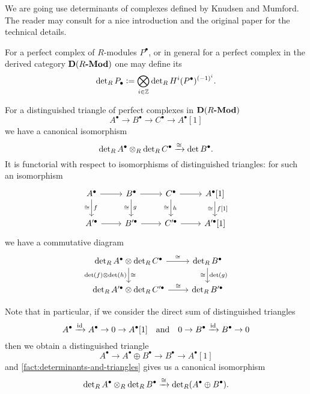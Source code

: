 We are going use determinants of complexes defined by Knudsen and Mumford.
The reader may consult \cite[Appendix A]{Gelfand-Kapranov-Zelevinsky} for a nice
introduction and the original paper \cite{Knudsen-Mumford-76} for the technical
details.

For a perfect complex of $R$-modules $P^\bullet$, or in general for a perfect
complex in the derived category $\text{\bf D} (R\text{\bf -Mod})$ one may define its
\[ \det\nolimits_R P_\bullet \mathrel{\mathop:}=
  \bigotimes_{i\in\mathbb{Z}} \det\nolimits_R H^i (P^\bullet)^{(-1)^i}. \]

\begin{fact}
  \label{fact:determinants-and-triangles}
  For a distinguished triangle of perfect complexes in
  $\text{\bf D} (R\text{\bf -Mod})$
  $$A^\bullet \to B^\bullet \to C^\bullet \to A^\bullet [1]$$
  we have a canonical isomorphism
  $$\det\nolimits_R A^\bullet \otimes_R \det\nolimits_R C^\bullet \xrightarrow{\cong} \det B^\bullet.$$
  It is functorial with respect to isomorphisms of distinguished triangles:
  for such an isomorphism
  \[ \begin{tikzcd}
      A^\bullet \arrow{r}\arrow{d}{f}[swap]{\isom} & B^\bullet \arrow{r}\arrow{d}{g}[swap]{\isom} & C^\bullet \arrow{r}\ar{d}{h}[swap]{\isom} & A^\bullet [1]\arrow{d}{f [1]}[swap]{\isom} \\
      A'^\bullet \arrow{r} & B'^\bullet \arrow{r} & C'^\bullet \arrow{r} & A'^\bullet [1]
    \end{tikzcd} \]
  we have a commutative diagram
  \[ \begin{tikzcd}
      \det\nolimits_R A^\bullet \otimes \det\nolimits_R C^\bullet \ar{r}{\isom} \ar{d}{\isom}[swap]{\det (f)\otimes \det (h)} & \det\nolimits_R B^\bullet \ar{d}{\det (g)}[swap]{\isom} \\
      \det\nolimits_R A'^\bullet \otimes \det\nolimits_R C'^\bullet \ar{r}{\isom} & \det\nolimits_R B'^\bullet
    \end{tikzcd} \]
\end{fact}

Note that in particular, if we consider the direct sum of distinguished
triangles
\[ A^\bullet \xrightarrow{\mathrm{id}} A^\bullet \to 0 \to A^\bullet[1]
  \quad\text{and}\quad
  0 \to B^\bullet \xrightarrow{\mathrm{id}} B^\bullet \to 0 \]
then we obtain a distinguished triangle
$$A^\bullet \to A^\bullet\oplus B^\bullet \to B^\bullet \to A^\bullet[1]$$
and \ref{fact:determinants-and-triangles} gives us a canonical isomorphism
\[ \det\nolimits_R A^\bullet \otimes_R \det\nolimits_R B^\bullet
  \xrightarrow{\cong}
  \det\nolimits_R (A^\bullet\oplus B^\bullet). \]


